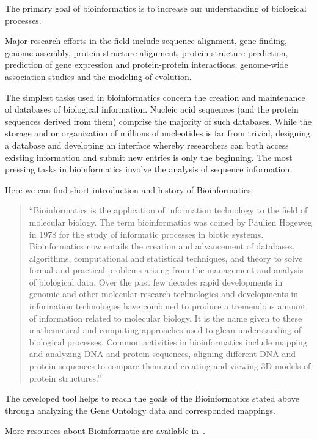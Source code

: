 The primary goal of bioinformatics is to increase our understanding of biological processes.


Major research efforts in the field include sequence alignment, gene finding, genome assembly, protein structure alignment, protein structure prediction, prediction of gene expression and protein-protein interactions, genome-wide association studies and the modeling of evolution.


The simplest tasks used in bioinformatics concern the creation and maintenance of databases of biological information.
Nucleic acid sequences (and the protein sequences derived from them) comprise the majority of such databases. While the storage and or organization of millions of nucleotides is far from trivial,
designing a database and developing an interface whereby researchers can both access existing information and submit new entries is only the beginning.
The most pressing tasks in bioinformatics involve the analysis of sequence information.~\cite{Biology}


Here we can find short introduction and history of Bioinformatics:

\begin{quotation}
``Bioinformatics is the application of information technology to the field of molecular biology.
The term bioinformatics was coined by Paulien Hogeweg in 1978 for the study of informatic processes in biotic systems.
Bioinformatics now entails the creation and advancement of databases, algorithms, computational and statistical techniques, and theory to solve formal and practical problems arising from the management and analysis of biological data.
Over the past few decades rapid developments in genomic and other molecular research technologies and developments in information technologies have combined to produce a tremendous amount of information related to molecular biology.
It is the name given to these mathematical and computing approaches used to glean understanding of biological processes.
Common activities in bioinformatics include mapping and analyzing DNA and protein sequences, aligning different DNA and protein sequences to compare them and creating and viewing 3D models of protein structures.''~\cite{Bioinformatic}
\end{quotation}

The developed tool helps to reach the goals of the Bioinformatics stated above through analyzing the Gene Ontology data and corresponded mappings.

More resources about Bioinformatic are available in~\cite{Bioinformatic_resources}.

